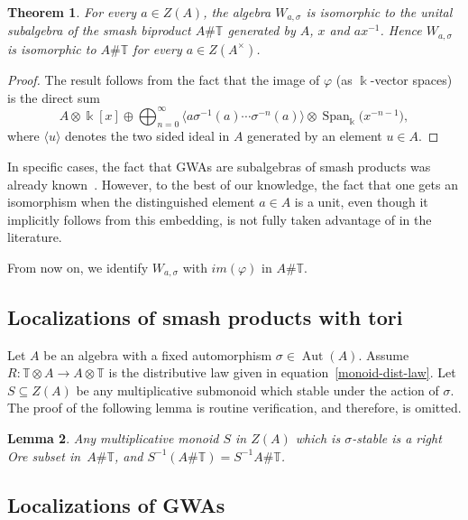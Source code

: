 \documentclass[10pt,a4paper]{amsart}
\newcommand{\B}[1]{\mathbb{#1}}
\numberwithin{equation}{section}
\newtheorem{Theorem}{Theorem}[section]
\newtheorem{Lemma}[Theorem]{Lemma}
\begin{document}
\begin{Theorem}\label{thm:UnitCase}
 For every $a\in Z(A)$, the algebra $W_{a,\sigma}$ is isomorphic to the unital subalgebra
 of the smash biproduct $A\# \B{T}$ generated by $A$, $x$ and $ax^{-1}$. Hence
 $W_{a,\sigma}$ is isomorphic to $A\# \B{T}$ for every $a\in Z(A^\times)$.
\end{Theorem}

\begin{proof}
 The result follows from the fact that the image of $\varphi$ (as $\Bbbk$-vector spaces)
 is the direct sum
 \[ A \otimes \Bbbk[x] \oplus \bigoplus_{n=0}^\infty \big\langle
 a\sigma^{-1}(a)\cdots\sigma^{-n}(a)\big\rangle\otimes \operatorname{Span}_{\Bbbk}\bigl(x^{-n-1}\bigr),
 \] where $\langle
 u\rangle$ denotes the two sided ideal in $A$ generated by an element $u\in A$.
\end{proof}

In specific cases, the fact that GWAs are subalgebras of smash products was already
known~\cite[Lemma~2.3]{Boddington:ResolutionOfTypeD}. However, to the best of our knowledge,
the fact that one gets an isomorphism when the distinguished element $a\in A$ is a unit,
even though it implicitly follows from this embedding, is not fully taken advantage of in
the literature.

From now on, we identify $W_{a,\sigma}$ with $im(\varphi)$ in $A\# \B{T}$.

\subsection{Localizations of smash products with tori}
\label{sect:localizationOfSmashProducts}

Let $A$ be an algebra with a fixed automorphism $\sigma\in \operatorname{Aut}(A)$. Assume
$R\colon \B{T}\otimes A\to A\otimes \B{T}$ is the distributive law given in
equation~\eqref{monoid-dist-law}. Let $S\subseteq Z(A)$ be any multiplicative submonoid
which stable under the action of $\sigma$. The proof of the following lemma is routine
verification, and therefore, is omitted.

\begin{Lemma}\label{lem:nc-localization}
 Any multiplicative monoid $S$ in $Z(A)$ which is $\sigma$-stable is a right Ore subset
 in~$A\# \B{T}$, and $S^{-1}(A\# \B{T}) = S^{-1}A\# \B{T}$.
\end{Lemma}

\subsection{Localizations of GWAs}
\end{document}
